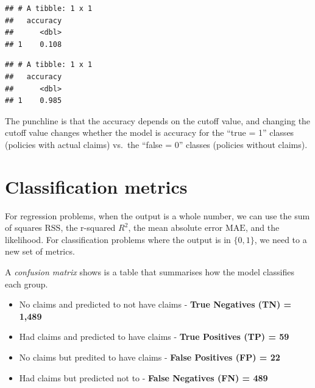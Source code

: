 \documentclass[openany]{book}
\newenvironment{Shaded}{\begin{snugshade}}{\end{snugshade}}
\newcommand{\DataTypeTok}[1]{\textcolor[rgb]{0.13,0.29,0.53}{#1}}
\newcommand{\DecValTok}[1]{\textcolor[rgb]{0.00,0.00,0.81}{#1}}
\newcommand{\KeywordTok}[1]{\textcolor[rgb]{0.13,0.29,0.53}{\textbf{#1}}}
\newcommand{\NormalTok}[1]{#1}
\newcommand{\OperatorTok}[1]{\textcolor[rgb]{0.81,0.36,0.00}{\textbf{#1}}}
\newcommand{\StringTok}[1]{\textcolor[rgb]{0.31,0.60,0.02}{#1}}
\providecommand{\tightlist}{%
  \setlength{\itemsep}{0pt}\setlength{\parskip}{0pt}}
\begin{document}
\begin{verbatim}
## # A tibble: 1 x 1
##   accuracy
##      <dbl>
## 1    0.108
\end{verbatim}

\begin{Shaded}
\end{Shaded}

\begin{verbatim}
## # A tibble: 1 x 1
##   accuracy
##      <dbl>
## 1    0.985
\end{verbatim}

The punchline is that the accuracy depends on the cutoff value, and changing the cutoff value changes whether the model is accuracy for the ``true = 1'' classes (policies with actual claims) vs.~the ``false = 0'' classes (policies without claims).

\hypertarget{classification-metrics}{%
\section{Classification metrics}\label{classification-metrics}}

For regression problems, when the output is a whole number, we can use the sum of squares \(\text{RSS}\), the r-squared \(R^2\), the mean absolute error \(\text{MAE}\), and the likelihood. For classification problems where the output is in \(\{0,1\}\), we need to a new set of metrics.

A \emph{confusion matrix} shows is a table that summarises how the model classifies each group.

\begin{itemize}
\tightlist
\item
  No claims and predicted to not have claims - \textbf{True Negatives (TN) = 1,489}
\item
  Had claims and predicted to have claims - \textbf{True Positives (TP) = 59}
\item
  No claims but predited to have claims - \textbf{False Positives (FP) = 22}
\item
  Had claims but predicted not to - \textbf{False Negatives (FN) = 489}
\end{itemize}
\end{document}
